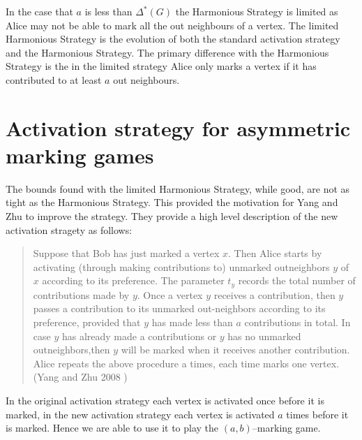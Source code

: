 \documentclass[11pt]{article}
\numberwithin{figure}{section}
\theoremstyle{definition}
\begin{document}
    In the case that $a$ is less than $\Delta^*(G)$ the Harmonious Strategy is limited as Alice may not be able to mark all the out neighbours of a vertex. The limited Harmonious Strategy is the evolution of both the standard activation strategy and the Harmonious Strategy. The primary difference with the Harmonious Strategy is the in the limited strategy Alice only marks a vertex if it has contributed to at least $a$ out neighbours.   
    
    \section{Activation strategy for asymmetric marking games}
    The bounds found with the limited Harmonious Strategy, while good, are not as tight as the Harmonious Strategy. This provided the motivation for Yang and Zhu to improve the strategy. They provide a high level description of the new activation stragety as follows:
    
    \begin{quotation}
        Suppose that Bob has just marked a vertex $x$. Then Alice starts by activating (through making contributions to) unmarked outneighbors $y$ of $x$ according to its preference. The parameter $t_y$ records the total number of contributions made by $y$. Once a vertex $y$ receives a contribution, then $y$ passes a contribution to its unmarked out-neighbors according to its preference, provided that $y$ has made less than $a$ contributions in total. In case $y$ has already made a contributions or $y$ has no unmarked outneighbors,then $y$ will be marked when it receives another contribution. Alice repeats the above procedure a times, each time marks one vertex. (Yang and Zhu 2008 \cite{yangZhu2008})
    \end{quotation}
    
    In the original activation strategy each vertex is activated once before it is marked, in the new activation strategy each vertex is activated $a$ times before it is marked. Hence we are able to use it to play the $(a,b)$--marking game.
   
    
    
\end{document}
